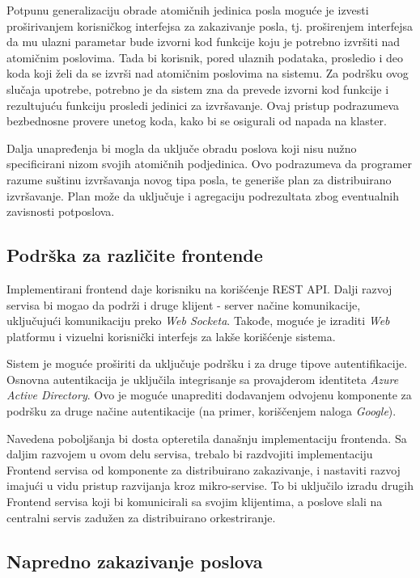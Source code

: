 \documentclass[12pt,oneside]{memoir}
\begin{document}
Potpunu generalizaciju obrade atomičnih jedinica posla moguće je izvesti proširivanjem korisničkog interfejsa za zakazivanje posla, tj. proširenjem interfejsa da mu ulazni parametar bude izvorni kod funkcije koju je potrebno izvršiti nad atomičnim poslovima. Tada bi korisnik, pored ulaznih podataka, prosledio i deo koda koji želi da se izvrši nad atomičnim poslovima na sistemu. Za podršku ovog slučaja upotrebe, potrebno je da sistem zna da prevede izvorni kod funkcije i rezultujuću funkciju prosledi jedinici za izvršavanje. Ovaj pristup podrazumeva bezbednosne provere unetog koda, kako bi se osigurali od napada na klaster.

Dalja unapređenja bi mogla da uključe obradu poslova koji nisu nužno specificirani nizom svojih atomičnih podjedinica. Ovo podrazumeva da programer razume suštinu izvršavanja novog tipa posla, te generiše plan za distribuirano izvršavanje. Plan može da uključuje i agregaciju podrezultata zbog eventualnih zavisnosti potposlova.


\subsection{Podrška za različite frontende}

Implementirani frontend daje korisniku na korišćenje REST API. Dalji razvoj servisa bi mogao da podrži i druge klijent - server načine komunikacije, uključujući komunikaciju preko \emph{Web Socketa}. Takođe, moguće je izraditi \emph{Web} platformu i vizuelni korisnički interfejs za lakše korišćenje sistema.

Sistem je moguće proširiti da uključuje podršku i za druge tipove autentifikacije. Osnovna autentikacija je uključila integrisanje sa provajderom identiteta \emph{Azure Active Directory}. Ovo je moguće unaprediti dodavanjem odvojenu komponente za podršku za druge načine autentikacije (na primer, koriščenjem naloga \emph{Google}).

Navedena poboljšanja bi dosta opteretila današnju implementaciju frontenda. Sa daljim razvojem u ovom delu servisa, trebalo bi razdvojiti implementaciju Frontend servisa od komponente za distribuirano zakazivanje, i nastaviti razvoj imajući u vidu pristup razvijanja kroz mikro-servise. To bi uključilo izradu drugih Frontend servisa koji bi komunicirali sa svojim klijentima, a poslove slali na centralni servis zadužen za distribuirano orkestriranje.

\subsection{Napredno zakazivanje poslova}
\end{document}
